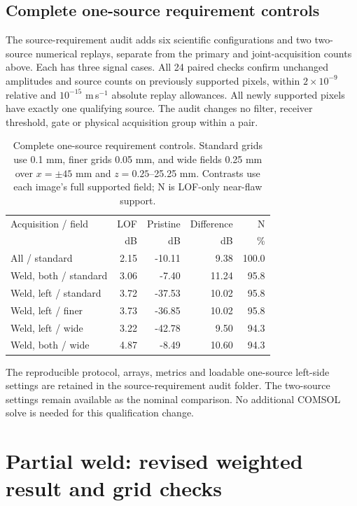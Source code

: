 \documentclass[11pt]{article}
\begin{document}
\subsection{Complete one-source requirement controls}
The source-requirement audit adds six scientific configurations and two
two-source numerical replays, separate from the primary and joint-acquisition
counts above. Each has three signal cases. All 24 paired checks confirm
unchanged amplitudes and source counts on previously supported pixels, within
$2\times10^{-9}$ relative and $10^{-15}$ m\,s$^{-1}$ absolute replay allowances.
All newly supported pixels have exactly one qualifying source. The audit
changes no filter, receiver threshold, gate or physical acquisition group
within a pair.
\begin{table}[!htbp]\centering\small
\caption{Complete one-source requirement controls. Standard grids use 0.1 mm,
finer grids 0.05 mm, and wide fields 0.25 mm over $x=\pm45$ mm and
$z=0.25$--25.25 mm. Contrasts use each image's full supported field; N is
LOF-only near-flaw support.}
\begin{tabularx}{\linewidth}{@{}Xrrrr@{}}\toprule
Acquisition / field & LOF & Pristine & Difference & N\\
 & dB & dB & dB & \%\\\midrule
All / standard & 2.15 & -10.11 & 9.38 & 100.0 \\
Weld, both / standard & 3.06 & -7.40 & 11.24 & 95.8 \\
Weld, left / standard & 3.72 & -37.53 & 10.02 & 95.8 \\
Weld, left / finer & 3.73 & -36.85 & 10.02 & 95.8 \\
Weld, left / wide & 3.22 & -42.78 & 9.50 & 94.3 \\
Weld, both / wide & 4.87 & -8.49 & 10.60 & 94.3 \\

\bottomrule\end{tabularx}
\end{table}
The reproducible protocol, arrays, metrics and loadable one-source left-side
settings are retained in the source-requirement audit folder. The two-source
settings remain available as the nominal comparison. No additional COMSOL
solve is needed for this qualification change.


\section{Partial weld: revised weighted result and grid checks}
\label{saft:updated}
\end{document}
